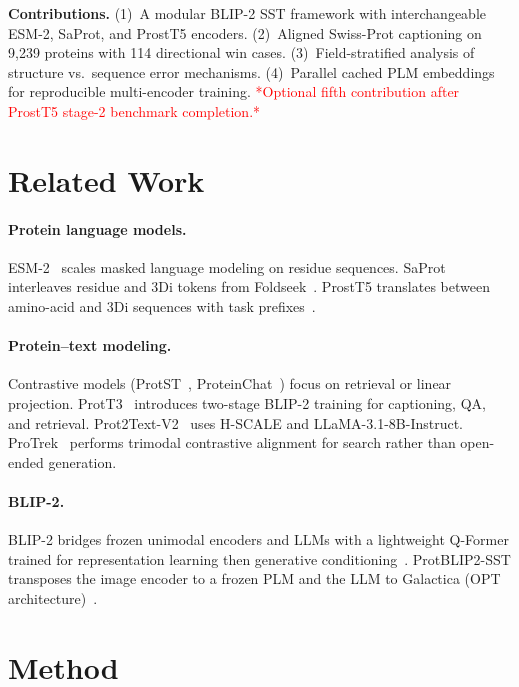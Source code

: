 \documentclass{article}
\newcommand{\tbd}[1]{\textcolor{red}{*#1*}}
\begin{document}
\textbf{Contributions.}
(1)~A modular BLIP-2 SST framework with interchangeable ESM-2, SaProt, and ProstT5 encoders.
(2)~Aligned Swiss-Prot captioning on 9{,}239 proteins with 114 directional win cases.
(3)~Field-stratified analysis of structure vs.\ sequence error mechanisms.
(4)~Parallel cached PLM embeddings for reproducible multi-encoder training.
\tbd{Optional fifth contribution after ProstT5 stage-2 benchmark completion.}

\section{Related Work}
\label{sec:related}

\paragraph{Protein language models.}
ESM-2~\cite{lin2023esm2} scales masked language modeling on residue sequences.
SaProt interleaves residue and 3Di tokens from Foldseek~\cite{vankempen2024foldseek}.
ProstT5 translates between amino-acid and 3Di sequences with task prefixes~\cite{heinzinger2024prostt5}.

\paragraph{Protein--text modeling.}
Contrastive models (ProtST~\cite{xu2023protst}, ProteinChat~\cite{guo2023proteinchat}) focus on retrieval or linear projection.
ProtT3~\cite{liu2024prott3} introduces two-stage BLIP-2 training for captioning, QA, and retrieval.
Prot2Text-V2~\cite{fei2025prot2text} uses H-SCALE and LLaMA-3.1-8B-Instruct.
ProTrek~\cite{su2025protrek} performs trimodal contrastive alignment for search rather than open-ended generation.

\paragraph{BLIP-2.}
BLIP-2 bridges frozen unimodal encoders and LLMs with a lightweight Q-Former trained for representation learning then generative conditioning~\cite{li2023blip2}.
ProtBLIP2-SST transposes the image encoder to a frozen PLM and the LLM to Galactica (OPT architecture)~\cite{taylor2022galactica,hu2022lora}.

\section{Method}
\label{sec:method}
\end{document}
